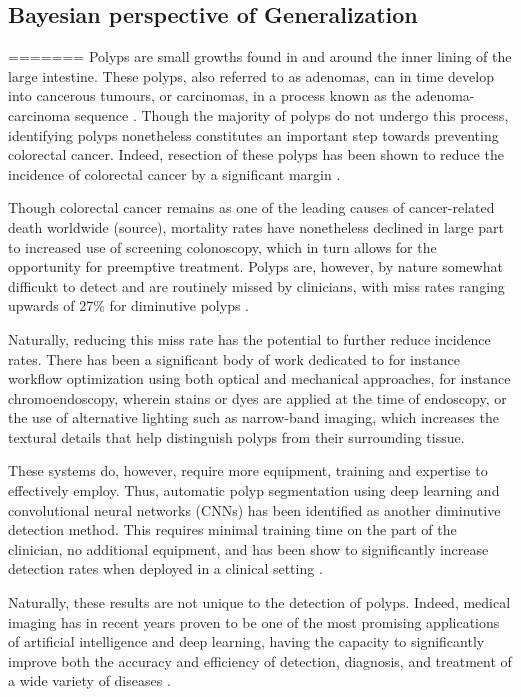 	\subsection{Bayesian perspective of Generalization}
=======
Polyps are small growths found in and around the inner lining of the large intestine. These polyps, also referred to as adenomas, can in time develop into cancerous tumours, or carcinomas, in a process known as the adenoma-carcinoma sequence \cite{ACS}. Though the majority of polyps do not undergo this process, identifying polyps nonetheless constitutes an important step towards preventing colorectal cancer. Indeed, resection of these polyps has been shown to reduce the incidence of colorectal cancer by a significant margin \cite{resection}.

Though colorectal cancer remains as one of the leading causes of cancer-related death worldwide (source), mortality rates have nonetheless declined in large part to increased use of screening colonoscopy, which in turn allows for the opportunity for preemptive treatment. Polyps are, however, by nature somewhat difficukt to detect and are routinely missed by clinicians, with miss rates ranging upwards of 27\% for diminutive polyps \cite{missrate1, missrate2}.

Naturally, reducing this miss rate has the potential to further reduce incidence rates. There has been a significant body of work dedicated to for instance workflow optimization using both optical and mechanical approaches, for instance chromoendoscopy, wherein stains or dyes are applied at the time of endoscopy, or the use of alternative lighting such as narrow-band imaging, which increases the textural details that help distinguish polyps from their surrounding tissue.

These systems do, however, require more equipment, training and expertise to effectively employ. Thus, automatic polyp segmentation using deep learning and convolutional neural networks (CNNs) has been identified as another diminutive detection method. This requires minimal training time on the part of the clinician, no additional equipment, and has been show to significantly increase detection rates when deployed in a clinical setting \cite{polyp-success-story}.

Naturally, these results are not unique to the detection of polyps. Indeed, medical imaging has in recent years proven to be one of the most promising applications of artificial intelligence and deep learning, having the capacity to significantly improve both the accuracy and efficiency of detection, diagnosis, and treatment of a wide variety of diseases \cite{dl_medical_imaging}.

